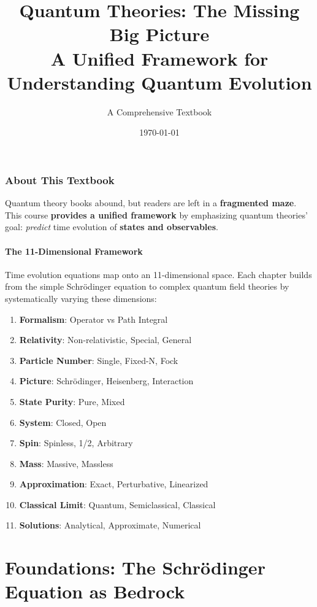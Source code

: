 \documentclass[12pt,oneside]{book}
\title{\textbf{Quantum Theories: The Missing Big Picture} \\
       \Large A Unified Framework for Understanding Quantum Evolution}
\author{A Comprehensive Textbook}
\date{\today}
\begin{document}
\maketitle

\section*{About This Textbook}

Quantum theory books abound, but readers are left in a \textbf{fragmented maze}. This course \textbf{provides a unified framework} by emphasizing quantum theories' goal: \textit{predict} time evolution of \textbf{states and observables}.

\subsection*{The 11-Dimensional Framework}

Time evolution equations map onto an 11-dimensional space. Each chapter builds from the simple Schrödinger equation to complex quantum field theories by systematically varying these dimensions:

\begin{enumerate}
  \item \textbf{Formalism}: Operator vs Path Integral
  \item \textbf{Relativity}: Non-relativistic, Special, General
  \item \textbf{Particle Number}: Single, Fixed-N, Fock
  \item \textbf{Picture}: Schrödinger, Heisenberg, Interaction
  \item \textbf{State Purity}: Pure, Mixed
  \item \textbf{System}: Closed, Open
  \item \textbf{Spin}: Spinless, 1/2, Arbitrary
  \item \textbf{Mass}: Massive, Massless
  \item \textbf{Approximation}: Exact, Perturbative, Linearized
  \item \textbf{Classical Limit}: Quantum, Semiclassical, Classical
  \item \textbf{Solutions}: Analytical, Approximate, Numerical
\end{enumerate}

\newpage
\tableofcontents
\newpage

\part{Foundations: The Schrödinger Equation as Bedrock}
\end{document}
